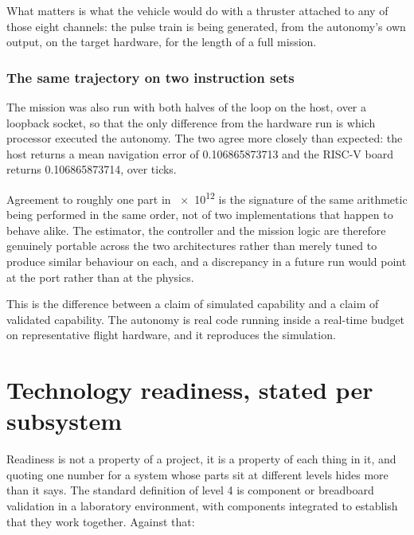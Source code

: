 \documentclass[10pt,a4paper]{article}
\begin{document}
What matters is what the vehicle would do with a thruster attached to any of
those eight channels: the pulse train is being generated, from the autonomy's
own output, on the target hardware, for the length of a full mission.

\subsubsection{The same trajectory on two instruction sets}

The mission was also run with both halves of the loop on the host, over a
loopback socket, so that the only difference from the hardware run is which
processor executed the autonomy. The two agree more closely than expected:
the host returns a mean navigation error of
\num{0.106865873713} and the RISC-V board returns \num{0.106865873714},
over \hilTicks{} ticks.

Agreement to roughly one part in \num{e12} is the signature of the same
arithmetic being performed in the same order, not of two implementations that
happen to behave alike. The estimator, the controller and the mission logic are
therefore genuinely portable across the two architectures rather than merely
tuned to produce similar behaviour on each, and a discrepancy in a future run
would point at the port rather than at the physics.

This is the difference between a claim of simulated capability and a claim of
validated capability. The autonomy is real code running inside a real-time
budget on representative flight hardware, and it reproduces the simulation.

\section{Technology readiness, stated per subsystem}\label{sec:trl}

Readiness is not a property of a project, it is a property of each thing in it,
and quoting one number for a system whose parts sit at different levels hides
more than it says. The standard definition of level 4 is component or
breadboard validation in a laboratory environment, with components integrated
to establish that they work together. Against that:
\end{document}
